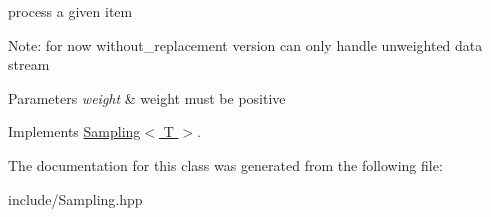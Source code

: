 process a given item 

Note\+: for now {\ttfamily without\+\_\+replacement} version can only handle unweighted data stream 
\begin{DoxyParams}{Parameters}
{\em weight} & weight must be positive \\
\hline
\end{DoxyParams}


Implements \hyperlink{classSampling}{Sampling$<$ T $>$}.



The documentation for this class was generated from the following file\+:\begin{DoxyCompactItemize}
\item 
include/Sampling.\+hpp\end{DoxyCompactItemize}
